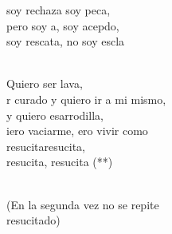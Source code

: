 \begin{cancion}[Resucitados][]
	soy rechaza soy peca, \\
	pero soy a, soy acepdo, \\
	soy rescata, no soy escla \\\jump\\
	\begin{chorus}%
	Quiero  ser lava, \\
	r curado y quiero ir a mi mismo, \\
	y quiero esarrodilla, \\
	iero vaciarme, ero vivir como\\
	resucitaresucita, \\
	resucita, resucita (**) \\
	\end{chorus}%
	\jump\\
(En la segunda vez no se repite\\
resucitado)\\
\end{cancion}%
